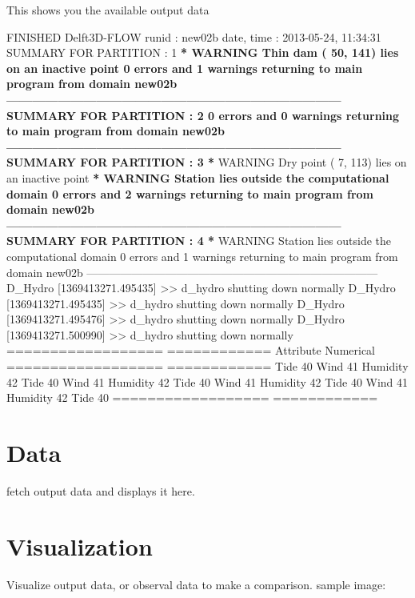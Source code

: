 \documentclass[letterpaper,10pt,openany, oneside]{sphinxmanual}
\begin{document}
This shows you the available output data

FINISHED Delft3D-FLOW runid : new02b date, time : 2013-05-24, 11:34:31 SUMMARY FOR PARTITION : 1 \textbf{* WARNING Thin dam ( 50, 141) lies on an inactive point 0 errors and 1 warnings returning to main program from domain new02b ------------------------------------------------------------------------------ SUMMARY FOR PARTITION : 2 0 errors and 0 warnings returning to main program from domain new02b ------------------------------------------------------------------------------ SUMMARY FOR PARTITION : 3 *} WARNING Dry point ( 7, 113) lies on an inactive point \textbf{* WARNING Station lies outside the computational domain 0 errors and 2 warnings returning to main program from domain new02b ------------------------------------------------------------------------------ SUMMARY FOR PARTITION : 4 *} WARNING Station lies outside the computational domain 0 errors and 1 warnings returning to main program from domain new02b ------------------------------------------------------------------------------ D\_Hydro {[}1369413271.495435{]} \textgreater{}\textgreater{} d\_hydro shutting down normally D\_Hydro {[}1369413271.495435{]} \textgreater{}\textgreater{} d\_hydro shutting down normally D\_Hydro {[}1369413271.495476{]} \textgreater{}\textgreater{} d\_hydro shutting down normally D\_Hydro {[}1369413271.500990{]} \textgreater{}\textgreater{} d\_hydro shutting down normally
==================   ============
Attribute            Numerical
==================   ============
Tide                 40
Wind                 41
Humidity             42
Tide                 40
Wind                 41
Humidity             42
Tide                 40
Wind                 41
Humidity             42
Tide                 40
Wind                 41
Humidity             42
Tide                 40
==================   ============


\chapter{Data}
\label{data:data}\label{data::doc}
fetch output data and displays it here.


\chapter{Visualization}
\label{visualization:visualization}\label{visualization::doc}
Visualize output data, or observal data to make a comparison.
sample image:
\end{document}
